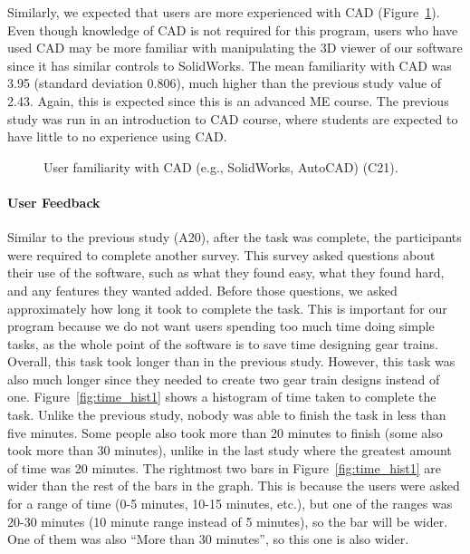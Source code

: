 \begin{doublespace}
Similarly, we expected that users are more experienced with CAD (Figure~\ref{fig:cad_first}). Even though knowledge of CAD is not required for this program, users who have used CAD may be more familiar with manipulating the 3D viewer of our software since it has similar controls to SolidWorks. The mean familiarity with CAD was 3.95 (standard deviation 0.806), much higher than the previous study value of 2.43. Again, this is expected since this is an advanced ME course. The previous study was run in an introduction to CAD course, where students are expected to have little to no experience using CAD.

\begin{figure}
    \centering
    \caption{User familiarity with CAD (e.g., SolidWorks, AutoCAD) (C21).}
    \label{fig:cad_first}
\end{figure}

\paragraph{User Feedback}
Similar to the previous study (A20), after the task was complete, the participants were required to complete another survey. This survey asked questions about their use of the software, such as what they found easy, what they found hard, and any features they wanted added. Before those questions, we asked approximately how long it took to complete the task. This is important for our program because we do not want users spending too much time doing simple tasks, as the whole point of the software is to save time designing gear trains. Overall, this task took longer than in the previous study. However, this task was also much longer since they needed to create two gear train designs instead of one. Figure~\ref{fig:time_hist1} shows a histogram of time taken to complete the task. Unlike the previous study, nobody was able to finish the task in less than five minutes. Some people also took more than 20 minutes to finish (some also took more than 30 minutes), unlike in the last study where the greatest amount of time was 20 minutes. The rightmost two bars in Figure~\ref{fig:time_hist1} are wider than the rest of the bars in the graph. This is because the users were asked for a range of time (0-5 minutes, 10-15 minutes, etc.), but one of the ranges was 20-30 minutes (10 minute range instead of 5 minutes), so the bar will be wider. One of them was also ``More than 30 minutes'', so this one is also wider.


\end{doublespace}
